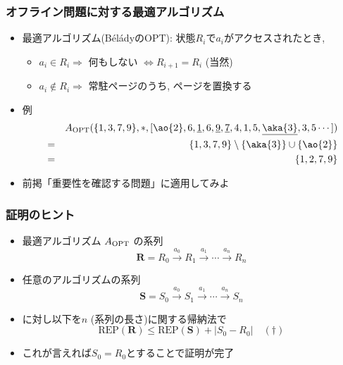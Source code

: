 \documentclass[12pt,dvipdfmx]{beamer}
\begin{document}
\begin{frame}
  \frametitle{オフライン問題に対する最適アルゴリズム}
  \begin{itemize}
  \item 最適アルゴリズム(B\'{e}l\'{a}dyのOPT): 状態$R_i$で$a_i$がアクセスされたとき,
    \begin{itemize}
    \item $a_i \in R_i \Rightarrow$ 何もしない $\iff R_{i+1} = R_i$  (当然)
    \item $a_i \not\in R_i \Rightarrow$ 常駐ページのうち,
      ページを置換する
    \end{itemize}
  \item 例
    \begin{eqnarray*}
      & & A_{\mbox{\scriptsize OPT}}(\{1,3,7,9\},\ast, [\ao{2},6,\underline{1},6,\underline{9},\underline{7},4,1,5,\underline{\aka{3}},3,5\cdots]) \\
      & = & \{1,3,7,9\} \setminus \{\aka{3}\} \cup \{\ao{2}\} \\
      & = & \{1,2,7,9\}
    \end{eqnarray*}

  \item 前掲「重要性を確認する問題」に適用してみよ
  \end{itemize}
\end{frame}

\begin{frame}
  \frametitle{証明のヒント}
  \begin{itemize}
  \item 最適アルゴリズム $A_{\mbox{\scriptsize OPT}}$ の系列
    \[ \boldsymbol{R} = R_0 \stackrel{a_0}{\longrightarrow} R_{1} \stackrel{a_{1}}{\longrightarrow} \cdots \stackrel{a_{n}}{\longrightarrow} R_n \]
  \item[] 任意のアルゴリズムの系列
    \[ \boldsymbol{S} = S_0 \stackrel{a_0}{\longrightarrow} S_{1} \stackrel{a_{1}}{\longrightarrow} \cdots \stackrel{a_{n}}{\longrightarrow} S_n \]
  \item[] に対し以下を$n$ (系列の長さ)に関する帰納法で
    \[ \mbox{REP}(\boldsymbol{R}) \leq \mbox{REP}(\boldsymbol{S}) + |S_0 - R_0| \quad (\dagger) \]
  \item これが言えれば$S_0 = R_0$とすることで証明が完了
  \end{itemize}
\end{frame}
\end{document}
